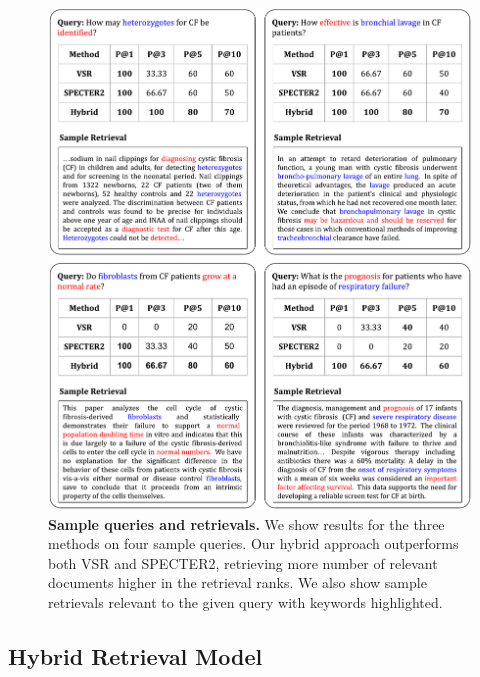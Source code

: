 \documentclass[
]{ceurart}
\begin{document}
\begin{figure}[!h]
\centering
\includegraphics[width=\linewidth]{figures/sample_retrievals.pdf}
\caption{\textbf{Sample queries and retrievals.} We show results for the three methods on four sample queries. Our hybrid approach outperforms both VSR and SPECTER2, retrieving more number of relevant documents higher in the retrieval ranks. We also show sample retrievals relevant to the given query with keywords highlighted.}
\label{fig:sample_retrievals}
\end{figure}


\subsection{Hybrid Retrieval Model}
\end{document}
